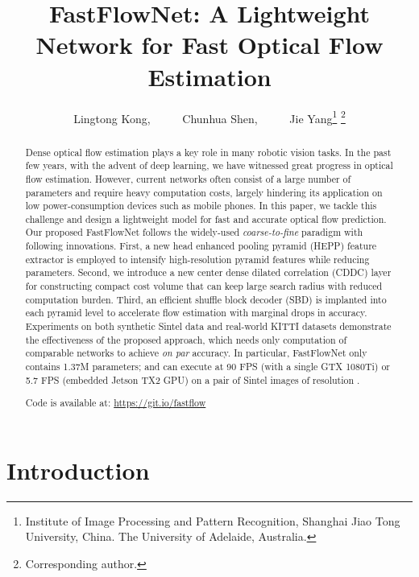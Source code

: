 \documentclass[letterpaper, 10 pt, conference]{ieeeconf}
\title{\LARGE \bf FastFlowNet: A Lightweight Network for Fast Optical Flow Estimation
}
\author{Lingtong Kong, 
~ ~ ~  Chunhua Shen, 
 ~ ~ ~ Jie Yang\thanks{ Institute of Image Processing and Pattern Recognition, Shanghai Jiao Tong University, China.  The University of Adelaide, Australia.}
\thanks{ Corresponding author.
}
}
\begin{document}
\maketitle
\thispagestyle{empty}
\pagestyle{empty}


\begin{abstract}

    Dense optical flow estimation plays a key role in many robotic vision tasks. 
In the past few years, 
    with the advent of deep learning,  we have witnessed great progress in optical flow estimation. 
    However, current networks often consist of 
    a large number of parameters and require heavy computation costs, 
largely hindering its application on low power-consumption devices such as mobile phones.
In this paper, we tackle this challenge and design a lightweight model
for fast and accurate optical flow prediction.
    Our proposed FastFlowNet follows the widely-used
    \textit{coarse-to-fine} paradigm
    with following innovations. First, a new head enhanced pooling pyramid (HEPP) feature extractor is employed to intensify high-resolution pyramid features while reducing parameters. Second, we introduce a new center dense dilated correlation (CDDC) layer for constructing compact cost volume that can keep large search radius with reduced computation burden. Third, an efficient shuffle block decoder (SBD) is implanted into each pyramid level to accelerate flow estimation with marginal drops in accuracy. Experiments on both synthetic Sintel data and real-world KITTI datasets demonstrate the effectiveness of the proposed approach, which needs 
    only   computation of comparable networks to achieve 
\textit{on par} accuracy.  
    In particular, FastFlowNet only contains 1.37M parameters; and can
execute 
    at 90 FPS (with a single GTX 1080Ti) or 5.7 FPS (embedded Jetson TX2 GPU)
on a pair of Sintel images of resolution  .


Code is 
available at: 
\def\UrlFont{\tt \color{blue}}
\url{https://git.io/fastflow}



\end{abstract}


\section{Introduction}
\end{document}
